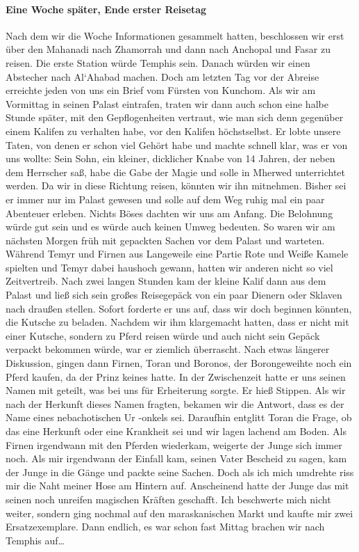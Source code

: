 \paragraph{Eine Woche später, Ende erster Reisetag}
Nach dem wir die Woche Informationen gesammelt hatten, beschlossen wir erst über den Mahanadi nach Zhamorrah und dann nach Anchopal und Fasar zu reisen. Die erste Station würde Temphis sein. Danach würden wir einen Abstecher nach Al`Ahabad machen. Doch am letzten Tag vor der Abreise erreichte jeden von uns ein Brief vom Fürsten von Kunchom. Als wir am Vormittag in seinen Palast eintrafen, traten wir dann auch schon eine halbe Stunde später, mit den Gepflogenheiten vertraut, wie man sich denn gegenüber einem Kalifen zu verhalten habe, vor den Kalifen höchstselbst. Er lobte unsere Taten, von denen er schon viel Gehört habe und machte schnell klar, was er von uns wollte: Sein Sohn, ein kleiner, dicklicher Knabe von 14 Jahren, der neben dem Herrscher saß, habe die Gabe der Magie und solle in Mherwed unterrichtet werden. Da wir in diese Richtung reisen, könnten wir ihn mitnehmen. Bisher sei er immer nur im Palast gewesen und solle auf dem Weg ruhig mal ein paar Abenteuer erleben. Nichts Böses dachten wir uns am Anfang. Die Belohnung würde gut sein und es würde auch keinen Umweg bedeuten. So waren wir am nächsten Morgen früh mit gepackten Sachen vor dem Palast und warteten. Während Temyr und Firnen aus Langeweile eine Partie Rote und Weiße Kamele spielten und Temyr dabei haushoch gewann, hatten wir anderen nicht so viel Zeitvertreib. Nach zwei langen Stunden kam der kleine Kalif dann aus dem Palast und ließ sich sein großes Reisegepäck von ein paar Dienern oder Sklaven nach draußen stellen. Sofort forderte er uns auf, dass wir doch beginnen könnten, die Kutsche zu beladen. Nachdem wir ihm klargemacht hatten, dass er nicht mit einer Kutsche, sondern zu Pferd reisen würde und auch nicht sein Gepäck verpackt bekommen würde, war er ziemlich überrascht. Nach etwas längerer Diskussion, gingen dann Firnen, Toran und Boronos, der Borongeweihte noch ein Pferd kaufen, da der Prinz keines hatte. In der Zwischenzeit hatte er uns seinen Namen mit geteilt, was bei uns für Erheiterung sorgte. Er hieß Stippen. Als wir nach der Herkunft dieses Namen fragten, bekamen wir die Antwort, dass es der Name eines nebachotischen Ur -onkels sei. Daraufhin entglitt Toran die Frage, ob das eine Herkunft oder eine Krankheit sei und wir lagen lachend am Boden. Als Firnen irgendwann mit den Pferden wiederkam, weigerte der Junge sich immer noch. Als mir irgendwann der Einfall kam, seinen Vater Bescheid zu sagen, kam der Junge in die Gänge und packte seine Sachen. Doch als ich mich umdrehte riss mir die Naht meiner Hose am Hintern auf. Anscheinend hatte der Junge das mit seinen noch unreifen magischen Kräften geschafft. Ich beschwerte mich nicht weiter, sondern ging nochmal auf den maraskanischen Markt und kaufte mir zwei Ersatzexemplare. Dann endlich, es war schon fast Mittag brachen wir nach Temphis auf\dots

